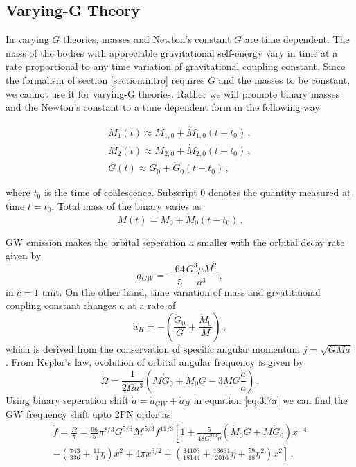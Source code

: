\documentclass[11pt]{article}
\begin{document}
 \subsection{Varying-G Theory}

 \hspace*{15.5pt} In varying $G$ theories, masses and Newton's constant $G$ are time dependent. The mass of the bodies with appreciable gravitational self-energy vary in time at a rate proportional to any time variation of gravitational coupling constant\cite{PhysRevLett.65.953}. Since the formalism of section \ref{section:intro} requires $G$ and the masses to be constant, we cannot use it for varying-G theories. Rather we will promote binary masses and the Newton's constant to a time dependent form in the following way
 
 \begin{eqnarray}\label{eq:3.7a2}
 M_1(t)\approx M_{1,0}+\dot{M}_{1,0}(t-t_0)\,, \\
 \label{eq:3.7a3}  M_2(t)\approx M_{2,0}+\dot{M}_{2,0}(t-t_0)\,, \\
   \label{eq:3.7a4}  G(t)\approx  G_0+\dot{G}_0(t-t_0)\, , 
 \end{eqnarray}
 
 where $t_0$ is the time of coalescence. Subscript $0$ denotes the quantity measured at time $t=t_0$. Total mass of the binary varies as
 \begin{equation}
 M(t)=M_0+\dot{M}_0(t-t_0)\,.
 \end{equation}
 
 \hspace*{15.5pt}GW emission makes the orbital seperation $a$ smaller with the orbital decay rate given by \cite{PhysRevD.49.2658}
 \begin{equation}
 \dot{a}_{GW}=-\frac{64}{5}\frac{G^3 \mu M^2}{a^3}\,,
 \end{equation}
 in $c=1$ unit. On the other hand, time variation of mass and grvatitaional coupling constant changes $a$ at a rate of 
 \begin{equation}
 \dot{a}_H=-\left(\frac{\dot{G}_0}{G}+\frac{\dot{M}_0}{M}\right)\,,
 \end{equation}
 which is derived from the conservation of specific angular momentum $j=\sqrt{GMa}$. From Kepler's law, evolution of orbital angular frequency is given by
 \begin{equation}\label{eq:3.7a}
 \dot{\Omega}=\frac{1}{2\Omega a^3}\left(M\dot{G}_0+\dot{M}_0G-3MG\frac{\dot{a}}{a}\right)\,.
 \end{equation}
 \hspace*{15.5pt} Using binary seperation shift $\dot{a}=\dot{a}_{GW}+\dot{a}_H$ in equation \eqref{eq:3.7a} we can find the GW frequency shift upto 2PN order as
\begin{align} \label{eq:3.7b}
 \dot{f}=\frac{\dot{\Omega}}{\pi}=\frac{96}{5}\pi^{8/3}G^{5/3}\mathcal{M}^{5/3}f^{11/3}\left[1+\frac{5}{48 G^{8/3}\eta}(\dot{M}_0G+M\dot{G}_0)x^{-4} \right. \nonumber\\ \left.  -\left(\frac{743}{336}+\frac{11}{4}\eta\right)x^2+4\pi x^{3/2}+\left(\frac{34103}{18144}+\frac{13661}{2016}\eta+\frac{59}{18}\eta^2\right)x^2 \right]\,,
 \end{align}
 
\end{document}
